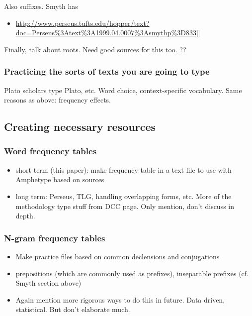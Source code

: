 \documentclass[11pt]{article}
\begin{document}
Also suffixes. Smyth has

\begin{itemize}
\item \url{http://www.perseus.tufts.edu/hopper/text?doc=Perseus\%3Atext\%3A1999.04.0007\%3Asmythp\%3D833}]]
\end{itemize}


Finally, talk about roots. Need good sources for this too. ??

\subsubsection{Practicing the sorts of texts you are going to type}
\label{sec:org9669707}

Plato scholars type Plato, etc. Word choice, context-specific vocabulary. Same reasons as above: frequency effects.

\subsection{Creating necessary resources}
\label{sec:org8b7c488}

\subsubsection{Word frequency tables}
\label{sec:org35b415f}

\begin{itemize}
\item short term (this paper): make frequency table in a text file to use with Amphetype based on sources
\item long term: Perseus, TLG, handling overlapping forms, etc. More of the methodology type stuff from DCC page. Only mention, don't discuss in depth.
\end{itemize}

\subsubsection{N-gram frequency tables}
\label{sec:orga0a455e}

\begin{itemize}
\item Make practice files based on common declensions and conjugations
\item prepositions (which are commonly used as prefixes), inseparable prefixes (cf. Smyth section above)

\item Again mention more rigorous ways to do this in future. Data driven, statistical. But don't elaborate much.
\end{itemize}
\end{document}
